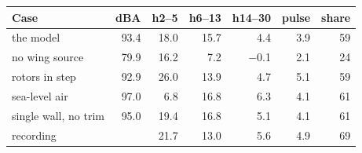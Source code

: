 \begin{tabular}{@{}lrrrrrr@{}}
\toprule
Case & dBA & h2--5 & h6--13 & h14--30 & pulse & share \\
\midrule
the model & 93.4 & 18.0 & 15.7 & 4.4 & 3.9 & 59 \\
no wing source & 79.9 & 16.2 & 7.2 & $-$0.1 & 2.1 & 24 \\
rotors in step & 92.9 & 26.0 & 13.9 & 4.7 & 5.1 & 59 \\
sea-level air & 97.0 & 6.8 & 16.8 & 6.3 & 4.1 & 61 \\
single wall, no trim & 95.0 & 19.4 & 16.8 & 5.1 & 4.1 & 61 \\
recording & & 21.7 & 13.0 & 5.6 & 4.9 & 69 \\
\bottomrule
\end{tabular}

